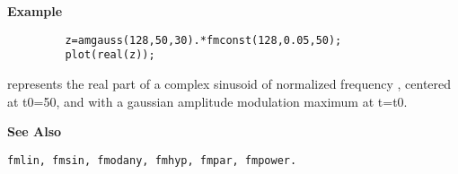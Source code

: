 {\bf \large \sf Example}\\
\hspace*{1.5cm}
\begin{minipage}[t]{13.5cm}
\begin{verbatim}
         z=amgauss(128,50,30).*fmconst(128,0.05,50);
         plot(real(z));
\end{verbatim}
represents the real part of a complex sinusoid of normalized frequency {}, centered at {\ty t0=50}, and with a gaussian amplitude modulation
maximum at {\ty t=t0}.
\end{minipage}
\vspace*{.5cm}


{\bf \large \sf See Also}\\
\hspace*{1.5cm}
\begin{minipage}[t]{13.5cm}
\begin{verbatim}
fmlin, fmsin, fmodany, fmhyp, fmpar, fmpower.
\end{verbatim}
\end{minipage}
